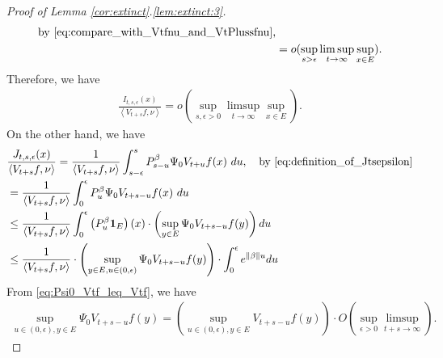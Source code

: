 \documentclass[12pt,a4paper]{amsart}
\numberwithin{equation}{section}
\theoremstyle{plain}
\theoremstyle{definition}
\begin{document}
\begin{proof}[Proof of Lemma \ref{cor:extinct}.\eqref{lem:extinct:3}]
\begin{align}
\quad\text{by~\eqref{eq:compare_with_Vtfnu_and_VtPlussfnu},}
\\&= o(\sup_{s>\epsilon}\limsup_{t\to \infty} \sup_{x\in E}) .
\end{align}
Therefore, we have
\begin{align}
  \frac{I_{t,s,\epsilon}(x)}{\left\langle V_{t+s}f,\nu \right\rangle} 
= o(\sup_{s, \epsilon >0} \limsup_{t\to \infty}\sup_{x\in E}).
  \label{eq:10}
\end{align}
On the other hand, we have
\begin{align}
& \frac{J_{t,s,\epsilon}(x)}{\left\langle V_{t+s}f,\nu \right\rangle} 
= \frac{1}{\left\langle V_{t+s}f,\nu \right\rangle}\int_{s-\epsilon}^s P_{s-u}^\beta \Psi_0 V_{t+u}f (x)~du ,\quad\text{by~\eqref{eq:definition_of_Jtsepsilon}}
\\&= \frac{1}{\left\langle V_{t+s}f,\nu \right\rangle} \int_0^\epsilon P_u^\beta \Psi_0 V_{t+s-u}f(x)~du
  \\ & \leq  \frac{1}{\left\langle V_{t+s}f,\nu \right\rangle} \int_0^\epsilon \left(P_u^\beta \mathbf 1_E\right)(x) \cdot \left( \sup_{y\in E} \Psi_0 V_{t+s - u} f(y) \right) du
  \\ & \leq  \frac{1}{\left\langle V_{t+s}f,\nu \right\rangle}\cdot \left( \sup_{y \in E, u \in (0, \epsilon)}\Psi_0 V_{t+s - u} f(y) \right) \cdot \int_0^\epsilon e^{\|\beta\|u}du 
\end{align}
From \eqref{eq:Psi0_Vtf_leq_Vtf}, we have
\begin{align}
  \sup_{u \in (0,\epsilon),y\in E}\Psi_0 V_{t+s-u}f(y) = \left(\sup_{u \in (0,\epsilon), y\in E} V_{t+s-u}f(y) \right)\cdot O(\sup_{\epsilon > 0}\limsup_{t+s\to \infty} ).
\end{align}


\end{proof}
\end{document}
